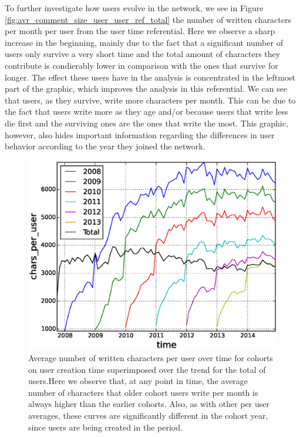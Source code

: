 To further investigate how users evolve in the network, we see in Figure \ref{fig:avr_comment_size_user_user_ref_total} the number of written characters per month per user from the user time referential. Here we observe a sharp increase in the beginning, mainly due to the fact that a significant number of users only survive a very short time and the total amount of characters they contribute is condierably lower in comparison with the ones that survive for longer. The effect these users have in the analysis is concentrated in the leftmost part of the graphic, which improves the analysis in this referential. We can see that users, as they survive, write more characters per month. This can be due to the fact that users write more as they age and/or because users that write less die first and the surviving ones are the ones that write the most. This graphic, however, also hides important information regarding the differences in user behavior according to the year they joined the network.

\begin{figure}[!tb]
\centering
\includegraphics[scale=0.4]{./images/avr_comment_size_user_over_time_cohorts.eps}
\caption{Average number of written characters per user over time for cohorts on user creation time superimposed over the trend for the total of users.Here we observe that, at any point in time, the average number of characters that older cohort users write per month is always higher than the earlier cohorts. Also, as with other per user averages, these curves are significantly different in the cohort year, since users are being created in the period.}
\label{fig:avr_comment_size_user_over_time_cohorts}
\end{figure}



